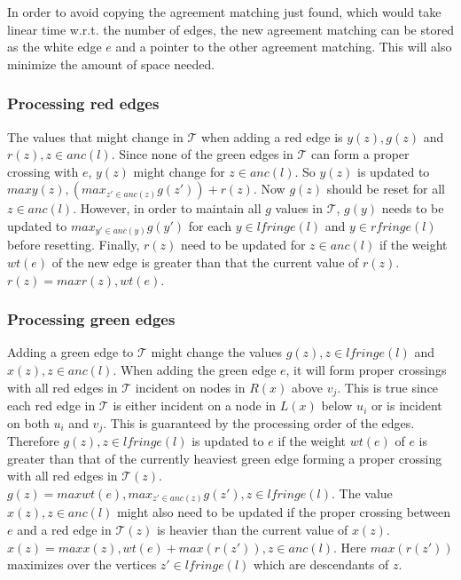 In order to avoid copying the agreement matching just found, which would take linear time w.r.t. the number of edges, the new agreement matching can be stored as the white edge $e$ and a pointer to the other agreement matching. This will also minimize the amount of space needed.

\subsubsection{Processing red edges}
The values that might change in $\mathcal{T}$ when adding a red edge is $y(z), g(z)$ and $r(z), z \in anc(l)$. Since none of the green edges in $\mathcal{T}$ can form a proper crossing with $e$, $y(z)$ might change for $z \in anc(l)$. So $y(z)$ is updated to $max{y(z), (max_{z' \in anc(z)} g(z')) + r(z)}$. Now $g(z)$ should be reset for all $z \in anc(l)$. However, in order to maintain all $g$ values in $\mathcal{T}$, $g(y)$ needs to be updated to $max_{y' \in anc(y)} g(y')$ for each $y \in lfringe(l)$ and $y \in rfringe(l)$ before resetting. Finally, $r(z)$ need to be updated for $z \in anc(l)$ if the weight $wt(e)$ of the new edge is greater than that the current value of $r(z)$. $r(z)=max{r(z), wt(e)}$.

\subsubsection{Processing green edges}
Adding a green edge to $\mathcal{T}$ might change the values $g(z), z \in lfringe(l)$ and $x(z), z \in anc(l)$. When adding the green edge $e$, it will form proper crossings with all red edges in $\mathcal{T}$ incident on nodes in $R(x)$ above $v_j$. This is true since each red edge in $\mathcal{T}$ is either incident on a node in $L(x)$ below $u_i$ or is incident on both $u_i$ and $v_j$. This is guaranteed by the processing order of the edges. Therefore $g(z), z \in lfringe(l)$ is updated to $e$ if the weight $wt(e)$ of $e$ is greater than that of the currently heaviest green edge forming a proper crossing with all red edges in $\mathcal{T}(z)$. $g(z)=max{wt(e), max_{z' \in anc(z)} g(z')}, z \in lfringe(l)$. The value $x(z), z \in anc(l)$ might also need to be updated if the proper crossing between $e$ and a red edge in $\mathcal{T}(z)$ is heavier than the current value of $x(z)$. $x(z)=max{x(z), wt(e) + max(r(z'))}, z \in anc(l)$. Here $max(r(z'))$ maximizes over the vertices $z' \in lfringe(l)$ which are descendants of $z$.

